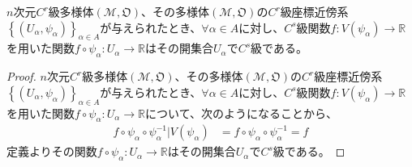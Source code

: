 \documentclass[dvipdfmx]{jsarticle}
\begin{document}
\begin{thm}\label{8.3.2.2}
$n$次元$C^{r}$級多様体$\left( \mathcal{M},\mathfrak{O} \right)$、その多様体$\left( \mathcal{M},\mathfrak{O} \right)$の$C^{r}$級座標近傍系$\left\{ \left( U_{\alpha},\psi_{\alpha} \right) \right\}_{\alpha \in A}$が与えられたとき、$\forall \alpha \in A$に対し、$C^s $級関数$f:V\left( \psi_\alpha \right) \rightarrow \mathbb{R} $を用いた関数$f\circ \psi_\alpha : U_\alpha \rightarrow \mathbb{R} $はその開集合$U_\alpha $で$C^s$級である。
\end{thm}
\begin{proof}
$n$次元$C^{r}$級多様体$\left( \mathcal{M},\mathfrak{O} \right)$、その多様体$\left( \mathcal{M},\mathfrak{O} \right)$の$C^{r}$級座標近傍系$\left\{ \left( U_{\alpha},\psi_{\alpha} \right) \right\}_{\alpha \in A}$が与えられたとき、$\forall \alpha \in A$に対し、$C^s $級関数$f:V\left( \psi_\alpha \right) \rightarrow \mathbb{R} $を用いた関数$f\circ \psi_\alpha : U_\alpha \rightarrow \mathbb{R} $について、次のようになることから、
\begin{align*}
  f\circ \psi_\alpha \circ \psi^{-1}_\alpha |V\left( \psi_\alpha \right) &= f\circ \psi_\alpha \circ \psi^{-1}_\alpha =f 
\end{align*}
定義よりその関数$f\circ \psi_\alpha : U_\alpha \rightarrow \mathbb{R} $はその開集合$U_\alpha $で$C^s$級である。
\end{proof}
\end{document}
